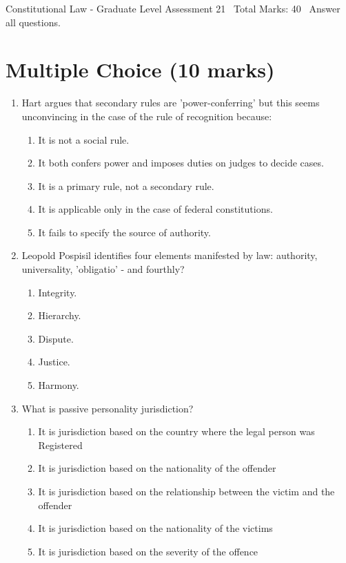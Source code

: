 \documentclass[12pt]{article}
\begin{document}
\begin{center}
Constitutional Law - Graduate Level Assessment 21 \
Total Marks: 40 \
Answer all questions.
\end{center}

\section*{Multiple Choice (10 marks)}
\begin{enumerate}[label=\arabic*.]
\item Hart argues that secondary rules are 'power-conferring' but this seems unconvincing in the case of the rule of recognition because:
\begin{enumerate}[label=(\alph*)]
    \item It is not a social rule.
    \item It both confers power and imposes duties on judges to decide cases.
    \item It is a primary rule, not a secondary rule.
    \item It is applicable only in the case of federal constitutions.
    \item It fails to specify the source of authority.
\end{enumerate}
\item Leopold Pospisil identifies four elements manifested by law: authority, universality, 'obligatio' - and fourthly?
\begin{enumerate}[label=(\alph*)]
    \item Integrity.
    \item Hierarchy.
    \item Dispute.
    \item Justice.
    \item Harmony.
\end{enumerate}
\item What is passive personality jurisdiction?
\begin{enumerate}[label=(\alph*)]
    \item It is jurisdiction based on the country where the legal person was Registered
    \item It is jurisdiction based on the nationality of the offender
    \item It is jurisdiction based on the relationship between the victim and the offender
    \item It is jurisdiction based on the nationality of the victims
    \item It is jurisdiction based on the severity of the offence

\end{enumerate}
\end{enumerate}
\end{document}

